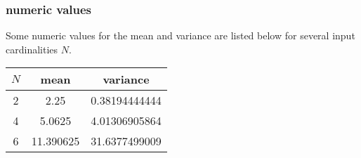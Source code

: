 \subsubsection{numeric values}
Some numeric values for the mean and variance are listed below for several input cardinalities $N$.
\begin{table}[h!]
  \centering
  \begin{tabular}{c|c|c}
    $N$ & mean & variance \\ \hline
    2 & 2.25      & 0.38194444444 \\
    4 & 5.0625    & 4.01306905864 \\
    6 & 11.390625 & 31.6377499009
  \end{tabular}
\end{table}
